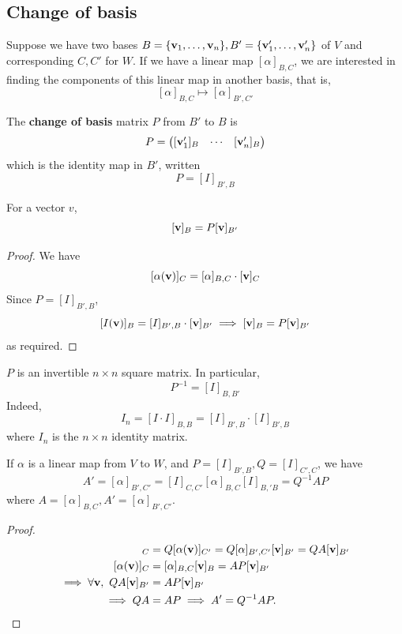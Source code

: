 \documentclass[a4paper]{article}
\begin{document}
\subsection{Change of basis}
Suppose we have two bases $ B = \qty{{\bf v}_1, \dots, {\bf v}_n}, B' = \qty{{\bf v}_1', \dots, {\bf v}_n'} $ of $ V $ and corresponding $ C, C' $ for $ W $.
If we have a linear map $ [\alpha]_{B,C} $, we are interested in finding the components of this linear map in another basis, that is,
\[
	[\alpha]_{B,C} \mapsto [\alpha]_{B',C'}
\]
\begin{definition}
	The \textbf{change of basis} matrix $ P $ from $ B' $ to $ B $ is
	\[
		P = \begin{pmatrix}
			[{\bf v}_1']_B & \cdots & [{\bf v}_n']_B
		\end{pmatrix}
	\]
	which is the identity map in $ B' $, written
	\[
		P = [I]_{B', B}
	\]
\end{definition}
\begin{lemma}
	For a vector $ v $,
	\[
		[{\bf v}]_B = P [{\bf v}]_{B'}
	\]
\end{lemma}
\begin{proof}
	We have
	\[
		[\alpha({\bf v})]_C = [\alpha]_{B,C} \cdot [{\bf v}]_C
	\]
	Since $ P = [I]_{B', B} $,
	\[
		[I({\bf v})]_B = [I]_{B', B} \cdot [{\bf v}]_{B'} \implies [{\bf v}]_B = P[{\bf v}]_{B'}
	\]
	as required.
\end{proof}
\begin{remark}
	$ P $ is an invertible $ n \times n $ square matrix.
	In particular,
	\[
		P^{-1} = [I]_{B,B'}
	\]
	Indeed,
	\[
		I_n = [I \cdot I]_{B,B} = [I]_{B',B} \cdot [I]_{B',B}
	\]
	where $ I_n $ is the $ n \times n $ identity matrix.
\end{remark}
\begin{proposition}
	If $ \alpha $ is a linear map from $ V $ to $ W $, and $ P = [I]_{B',B}, Q = [I]_{C',C} $, we have
	\[
		A' = [\alpha]_{B',C'} = [I]_{C,C'}[\alpha]_{B,C}[I]_{B,'B} = Q^{-1}AP
	\]
	where $ A = [\alpha]_{B,C}, A' = [\alpha]_{B',C'} $.
\end{proposition}
\begin{proof}
	\begin{align*}
		[\alpha(\bfv)]_C                     &= Q [\alpha(\bfv)]_{C'}= Q [\alpha]_{B',C'} [\bfv]_{B'} = QA [\mathbf{v}]_{B'} \\
		[\alpha(\bfv)]_C                     & = [\alpha]_{B,C} [\bfv]_B        = AP[\bfv]_{B'}                  \\
		\implies \forall \bfv,\ QA[\bfv]_{B'} & = AP[\bfv]_{B'}                  \\
		\implies QA                     & = AP \implies A'=Q^{-1}AP.\qedhere
	\end{align*}
\end{proof}
\end{document}
